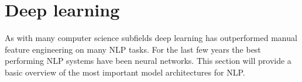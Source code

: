 \section{Deep learning}
\label{sec:deep_learning}

As with many computer science subfields deep learning has outperformed manual feature engineering on many NLP tasks.
For the last few years the best performing NLP systems have been neural networks.
This section will provide a basic overview of the most important model architectures for NLP.

